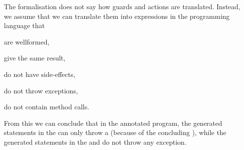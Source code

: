 
The formalisation does not say how guards and actions are
translated. Instead, we assume that we can translate them
into expressions in the programming language that
\begin{inparaenum}
\item are wellformed,
\item give the same result,
\item do not have side-effects,
\item do not throw exceptions,
\item do not contain method calls.
\end{inparaenum}
From this we can conclude that in the annotated program, the generated
statements in the \preset can only throw a \JMLExc (because of the
concluding \Assert), while the generated statements in the \postset
and \excset do not throw any exception.

